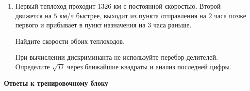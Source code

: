 \documentclass[a4paper,12pt]{article}
\begin{document}
\begin{enumerate}[label=\textbf{\arabic*.},resume]

\item
Первый теплоход проходит \(1326\) км с постоянной скоростью. Второй движется на \(5\) км/ч быстрее, выходит из пункта отправления на \(2\) часа позже первого и прибывает в пункт назначения на \(3\) часа раньше.

Найдите скорости обоих теплоходов.

При вычислении дискриминанта не используйте перебор делителей. Определите \(\sqrt D\) через ближайшие квадраты и анализ последней цифры.

\end{enumerate}


\clearpage

\begin{center}
{\LARGE\bfseries\color{darkaccent}Ответы к тренировочному блоку}
\end{center}

\vspace{4mm}
\end{document}

